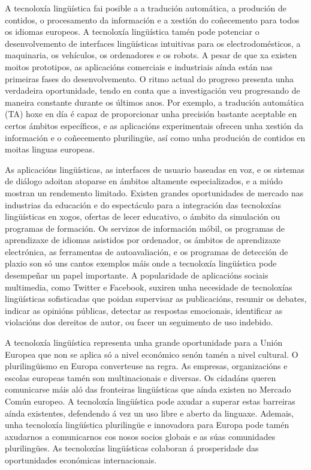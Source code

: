 \begin{multicols}{2}
    A tecnoloxía lingüística fai posible a a tradución automática, a produción de contidos, o procesamento da información e a xestión do coñecemento para todos os idiomas europeos. A tecnoloxía lingüística tamén pode potenciar o desenvolvemento de interfaces lingüísticas intuitivas para os electrodomésticos, a maquinaria, os vehículos, os ordenadores e os robots. A pesar de que xa existen moitos prototipos, as aplicacións comerciais e industriais aínda están nas primeiras fases do desenvolvemento. O ritmo actual do progreso presenta unha verdadeira oportunidade, tendo en conta que a investigación veu progresando de maneira constante durante os últimos anos. Por exemplo, a tradución automática (TA) hoxe en día é capaz de proporcionar unha precisión bastante aceptable en certos ámbitos específicos, e as aplicacións experimentais ofrecen unha xestión da información e o coñecemento plurilingüe, así como unha produción de contidos en moitas linguas europeas. 

As aplicacións lingüísticas, as interfaces de usuario baseadas en voz, e os sistemas de diálogo adoitan atoparse en ámbitos altamente especializados, e a miúdo mostran un rendemento limitado. Existen grandes oportunidades de mercado nas industrias da educación e do espectáculo para a integración das tecnoloxías lingüísticas en xogos, ofertas de lecer educativo, o ámbito da simulación ou programas de formación. Os servizos de información móbil, os programas de aprendizaxe de idiomas asistidos por ordenador, os ámbitos de aprendizaxe electrónica, as ferramentas de autoavaliación, e os programas de detección de plaxio son só uns cantos exemplos máis onde a tecnoloxía lingüística pode desempeñar un papel importante. A popularidade de aplicacións sociais multimedia, como Twitter e Facebook, suxiren unha necesidade de tecnoloxías lingüísticas sofisticadas que poidan supervisar as publicacións, resumir os debates, indicar as opinións públicas, detectar as respostas emocionais, identificar as violacións dos dereitos de autor, ou facer un seguimento de uso indebido.


A tecnoloxía lingüística representa unha grande oportunidade para a Unión Europea que non se aplica só a nivel económico senón tamén a nivel cultural. O plurilingüismo en Europa converteuse na regra. As empresas, organizacións e escolas europeas tamén son multinacionais e diversas. Os cidadáns queren comunicarse máis aló das fronteiras lingüísticas que aínda existen no Mercado Común europeo. A tecnoloxía lingüística pode axudar a superar estas barreiras aínda existentes, defendendo á vez un uso libre e aberto da linguaxe. Ademais, unha tecnoloxía lingüística plurilingüe e innovadora para Europa pode tamén axudarnos a comunicarnos cos nosos socios globais e as súas comunidades plurilingües. As tecnoloxías lingüísticas colaboran á prosperidade das oportunidades económicas internacionais.




\end{multicols}
